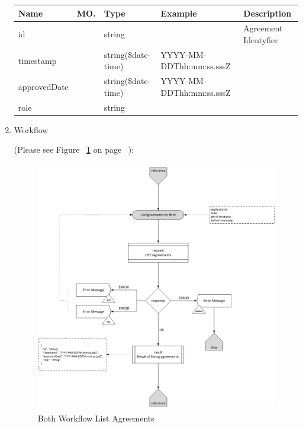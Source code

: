 \begin{enumerate}
\begin{center}
\begin{tabular}{|p{3cm}|l|p{3cm}|p{3cm}|p{4cm}|} 
\hline
\rowcolor{lightgray}	Name	& MO.	& Type	& Example & 	Description \\
\hline

id				& 	& 	string				&								&	Agreement Identyfier \\ 
\hline

timestamp		& 	& 	string(\$date-time)	&	YYYY-MM-DDThh:mm:ss.sssZ	&	 \\ 
\hline

approvedDate	& 	& 	string(\$date-time)	&	YYYY-MM-DDThh:mm:ss.sssZ	&	 \\ 
\hline

role			& 	& 	string				&								&	 \\ 
\hline

\end{tabular}
\end{center}


\item Workflow

(Please see Figure ~\ref{fig:BLA} on page ~\pageref{fig:BLA}):

\begin{figure}[htbp]
    \centering
    \includegraphics[width=11cm,height=11cm,angle=0]{./diag/Workflow/Market/ListAgreements-B-Workflow.png}
    \caption{Both Workflow List Agreements }
	\label{fig:BLA}
\end{figure}

\end{enumerate}

